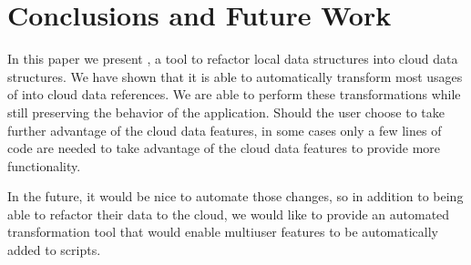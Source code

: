 \documentclass{sigplanconf}
\begin{document}
\section{Conclusions and Future Work}
\label{sec:conclusions}
In this paper we present \tool, a tool to refactor local data structures into cloud data structures.  We have shown that it is able to automatically transform most usages of \NC{} into cloud data references.  We are able to perform these transformations while still preserving the behavior of the application.  Should the user choose to take further advantage of the cloud data features, in some cases only a few lines of code are needed to take advantage of the cloud data features to provide more functionality. 

In the future, it would be nice to automate those changes, so in addition to being able to refactor their data to the cloud, we would like to provide an automated transformation tool that would enable multiuser features to be automatically added to scripts.









\end{document}
